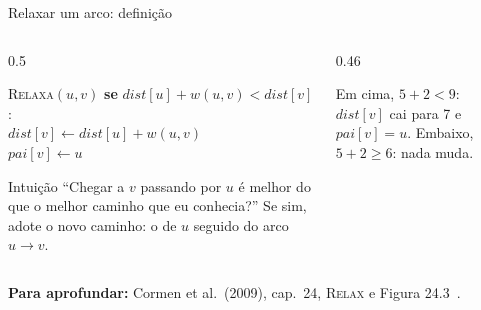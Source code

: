 \documentclass[aspectratio=169,xcolor=table]{beamer}
\newcommand{\fonte}[1]{%
  \vfill
  {\tiny\color{gray!55!black}\textbf{Para aprofundar:} #1\par}%
}
\begin{document}
\begin{frame}{Relaxar um arco: definição}
  \begin{columns}[c]
    \begin{column}{0.5\textwidth}
      \begin{block}{\textsc{Relaxa}$(u, v)$}
        \small
        \textbf{se} $\mathit{dist}[u] + w(u,v) < \mathit{dist}[v]$:\\
        \quad $\mathit{dist}[v] \gets \mathit{dist}[u] + w(u,v)$\\
        \quad $\mathit{pai}[v] \gets u$
      \end{block}
      \begin{exampleblock}{Intuição}
        \scriptsize ``Chegar a $v$ passando por $u$ é melhor do que o melhor caminho que eu
        conhecia?'' Se sim, adote o novo caminho: o de $u$ seguido do arco $u \to v$.
      \end{exampleblock}
    \end{column}
    \begin{column}{0.46\textwidth}
      \begin{center}
      \end{center}
      \scriptsize
      Em cima, $5 + 2 < 9$: $\mathit{dist}[v]$ cai para 7 e $\mathit{pai}[v] = u$. Embaixo,
      $5 + 2 \ge 6$: nada muda.
    \end{column}
  \end{columns}
  \fonte{Cormen et al.\ (2009), cap.~24, \textsc{Relax} e Figura 24.3~\cite{cormen2009introduction}.}
\end{frame}
\end{document}
